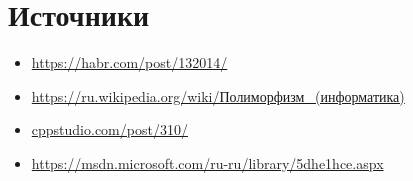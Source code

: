 \documentclass {article}
\begin{document}
\section{Источники}
\begin{itemize}
\item \url{https://habr.com/post/132014/}
\item \url{https://ru.wikipedia.org/wiki/Полиморфизм\_(информатика)}
\item \url{cppstudio.com/post/310/}
\item \url{https://msdn.microsoft.com/ru-ru/library/5dhe1hce.aspx}
\end{itemize}
\tableofcontents
\end{document}
